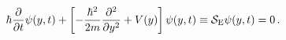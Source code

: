 \begin{equation}
\hbar \frac{\partial}{\partial t} \psi(y,t) +
\left[ - \frac{\hbar^2}{2m} \frac{\partial^2}{\partial y^2}
       + V(y) \right] \psi(y,t) 
\equiv {\cal S}_\mathrm{E} \psi(y,t) = 0 \, .
\label{eq20}
\end{equation}

